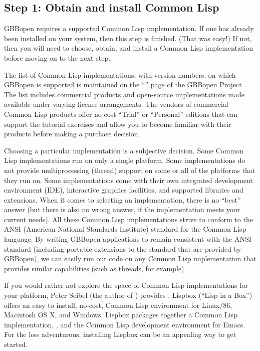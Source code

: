 \documentclass[10pt,twoside,english,pdftex]{article}
\begin{document}
\fndocrule

\subsection*{Step 1: Obtain and install Common Lisp}

%
GBBopen requires a supported Common Lisp implementation.  If one has already
been installed on your system, then this step is finished.  (That was easy!)
If not, then you will need to choose, obtain, and install a Common Lisp
implementation before moving on to the next step.

The list of Common Lisp implementations, with version numbers, on which
GBBopen is supported is maintained on the ``'' page of the GBBopen Project
.  The list includes commercial
products and open-source implementations made available under varying license
arrangements.  The vendors of commercial Common Lisp products offer no-cost
``Trial'' or ``Personal'' editions that can support the tutorial exercises and
allow you to become familiar with their products before making a purchase
decision.

Choosing a particular implementation is a subjective decision.  Some Common
Lisp implementations run on only a single platform.  Some implementations do
not provide multiprocessing (thread) support on some or all of the platforms
that they run on.  Some implementations come with their own integrated
development environment (IDE), interactive graphics facilities, and supported
libraries and extensions.  When it comes to selecting an implementation, there
is no ``best'' answer (but there is also no wrong answer, if the
implementation meets your current needs).  All these Common Lisp
implementations strive to conform to the ANSI (American National Standards
Institute) standard for the Common Lisp language.  By writing GBBopen
applications to remain consistent with the ANSI standard (including portable
extensions to the standard that are provided by GBBopen), we can easily run
our code on any Common Lisp implementation that provides similar capabilities
(such as threads, for example).

If you would rather not explore the space of Common Lisp implementations for
your platform, Peter Seibel (the author of ) provides
.  Lispbox
(``Lisp in a Box'') offers an easy to install, no-cost, Common Lisp
environment for Linux/86, Macintosh OS X, and Windows.  Lispbox packages
together a Common Lisp implementation,
, and the
 Common Lisp
development environment for Emacs.  For the less adventurous, installing
Lispbox can be an appealing way to get started.
\end{document}
